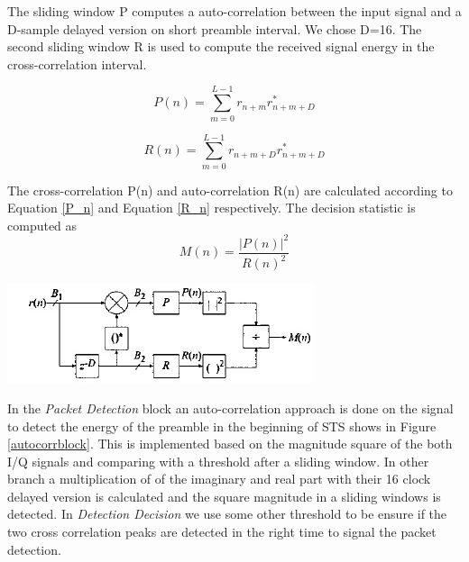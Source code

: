 The sliding window P computes a auto-correlation between the input signal and a D-sample delayed version on short preamble interval. We chose D=16. The second sliding window R is used to compute the received signal energy in the cross-correlation interval.

\begin{equation} \label{P_n}
P(n) = \sum\limits_{m=0}^{L-1} r_{n+m} r^{*}_{n+m+D}
\end{equation}

\begin{equation} \label{R_n}
 R(n) = \sum\limits_{m=0}^{L-1} r_{n+m+D} r^{*}_{n+m+D}
\end{equation}

The cross-correlation P(n) and auto-correlation R(n) are calculated according to Equation \ref{P_n} and Equation \ref{R_n} respectively. The decision statistic is computed as\\

\begin{equation} \label{M_n}
M(n)= \dfrac{|P(n)|^{2}}{R(n)^{2}}
\end{equation}


\begin{center}
\includegraphics[width=\textwidth]{content/fig/schimdl_cox.JPG}
\label{schimdl_cox}
\end{center}

In the \textit{Packet Detection} block an auto-correlation approach is done on the signal to detect the energy of the preamble in the beginning of STS shows in Figure \ref{autocorrblock}. This is implemented based on the magnitude square of the both I/Q signals and comparing with a threshold after a sliding window. In other branch a multiplication of of the imaginary and real part with their 16 clock delayed version is calculated and the square magnitude in a sliding windows is detected. In \textit{Detection Decision} we use some other threshold to be ensure if the two cross correlation peaks are detected in the right time to signal the packet detection.

